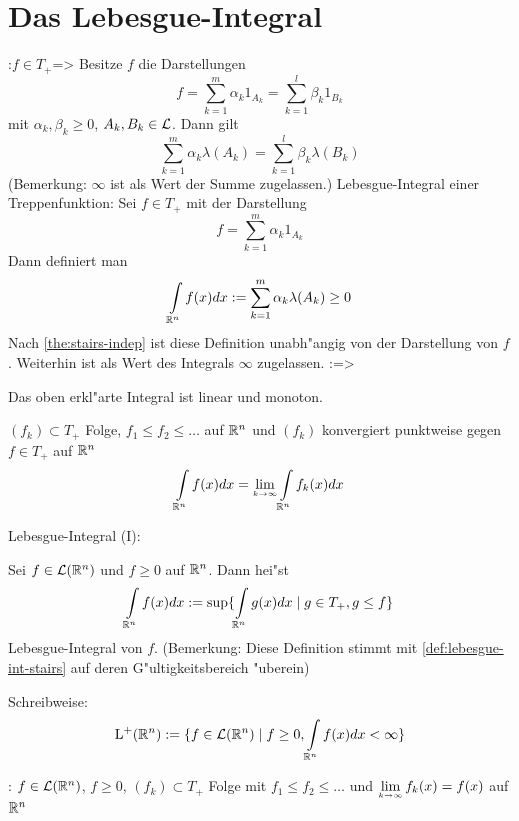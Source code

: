 \section{Das Lebesgue-Integral}
\theorem:$f\in T_+$=>{
  \label{the:stairs-indep}
  Besitze $f$ die Darstellungen
  \[f=\sum_{k=1}^m \alpha_k 1_{A_k}=\sum_{k=1}^l \beta_k 1_{B_k}
    \]
  mit $\alpha_k,\beta_k\ge 0$, $A_k,B_k\in\mathcal{L}$. Dann gilt
  \[\sum_{k=1}^m \alpha_k \lambda(A_k)=\sum_{k=1}^l \beta_k \lambda(B_k)
    \]
  (Bemerkung: $\infty$ ist als Wert der Summe zugelassen.)
  }
 Lebesgue-Integral einer Treppenfunktion:{
  Sei $f\in T_+$ mit der Darstellung
  \[f=\sum_{k=1}^m \alpha_k 1_{A_k}
    \]
  Dann definiert man
  \[\int_{\SetR^n} f(x) dx:=\sum_{k=1}^m \alpha_k \lambda(A_k)\ge 0
    \]
  Nach \ref{the:stairs-indep} ist diese Definition unabh"angig von der
  Darstellung von $f$. Weiterhin ist als Wert des Integrals $\infty$ zugelassen.
  \label{def:lebesgue-int-stairs}
  }
\theorem:=>{
  \begin{stmts}
    \item Das oben erkl"arte Integral ist linear und monoton.
    \item $(f_k)\subset T_+$ Folge, $f_1\le f_2 \le \ldots$ auf $\mathbb R^n$
      und $(f_k)$ konvergiert punktweise gegen $f\in T_+$ auf $\mathbb R^n$
      \[\int_{\SetR^n} f(x)dx=\limes k->\infty \int_{\SetR^n} f_k(x)dx
        \]
    \end{stmts}
  }
 Lebesgue-Integral (I):{
  \label{def:lebesgue-pos}
  Sei $f\in\mathcal{L}(\mathbb R^n)$ und $f\ge 0$ auf $\mathbb R^n$. Dann hei"st
  \[\int_{\SetR^n} f(x)dx:=\sup\{\int_{\SetR^n} g(x) dx\mid g\in T_+,g\le f\}
    \]
  Lebesgue-Integral von $f$. (Bemerkung: Diese Definition stimmt mit 
  \ref{def:lebesgue-int-stairs} auf deren G"ultigkeitsbereich "uberein)

  Schreibweise: 
  \[\SetLInt^+(\SetR^n):=
    \{f\in\SetFLMeas(\SetR^n)\mid f\ge 0, \int_{\SetR^n} f(x) dx < \infty\}
    \]
  }
\theorem: $f\in\mathcal{L}(\mathbb R^n)$, $f\ge 0$, $(f_k)\subset T_+$ Folge
  mit $f_1\le f_2\le \ldots$ und $\limes k->\infty f_k(x)=f(x)$ auf $\mathbb R^n$ 
